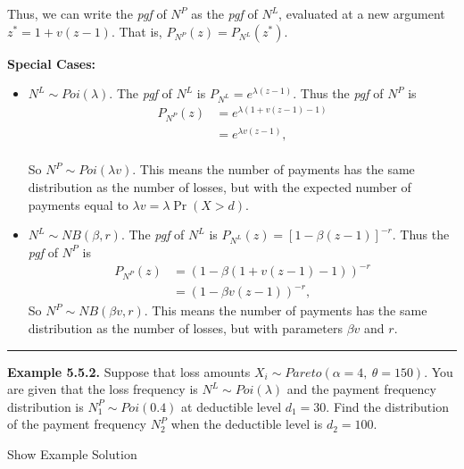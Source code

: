 \documentclass[]{book}
\theoremstyle{definition}
\theoremstyle{definition}
\theoremstyle{definition}
\theoremstyle{remark}
\begin{document}
Thus, we can write the \emph{pgf} of \(N^P\) as the \emph{pgf} of
\(N^L\), evaluated at a new argument \(z^* = 1+v(z-1)\). That is,
\(P_{N^P}(z)=P_{N^L}(z^*)\).

\textbf{Special Cases:}

\begin{itemize}
\item
  \(N^L\sim Poi (\lambda)\). The \emph{pgf} of \(N^L\) is
  \(P_{N^L}=e^{\lambda(z-1)}\). Thus the \emph{pgf} of \(N^P\) is
  \[\begin{aligned}
  P_{N^P}(z) &= e^{ \lambda(1+v(z-1)-1)} \\
  &= e^{\lambda v(z-1)} ,
  \end{aligned}\]\\
  So \(N^P \sim Poi(\lambda v)\). This means the number of payments has
  the same distribution as the number of losses, but with the expected
  number of payments equal to \(\lambda v = \lambda \Pr(X>d)\).
\item
  \(N^L \sim NB(\beta, r)\). The \emph{pgf} of \(N^L\) is
  \(P_{N^{L}}\left( z\right) =\left[ 1-\beta \left( z-1\right)\right]^{-r}\).
  Thus the \emph{pgf} of \(N^P\) is \[\begin{aligned}
  P_{N^P}(z)&= \left( 1-\beta (1+v(z-1)-1)\right)^{-r}\\
  &= \left( 1-\beta v(z-1)\right)^{-r},
  \end{aligned}\] So \(N^P \sim NB(\beta v, r)\). This means the number
  of payments has the same distribution as the number of losses, but
  with parameters \(\beta v\) and \(r\).
\end{itemize}

\begin{center}\rule{0.5\linewidth}{\linethickness}\end{center}

\textbf{Example 5.5.2.} Suppose that loss amounts
\(X_i\sim Pareto(\alpha=4,\ \theta=150)\). You are given that the loss
frequency is \(N^L\sim Poi(\lambda)\) and the payment frequency
distribution is \(N^{P}_1\sim Poi(0.4)\) at deductible level \(d_1=30\).
Find the distribution of the payment frequency \(N^{P}_2\) when the
deductible level is \(d_2=100\).

Show Example Solution
\end{document}
